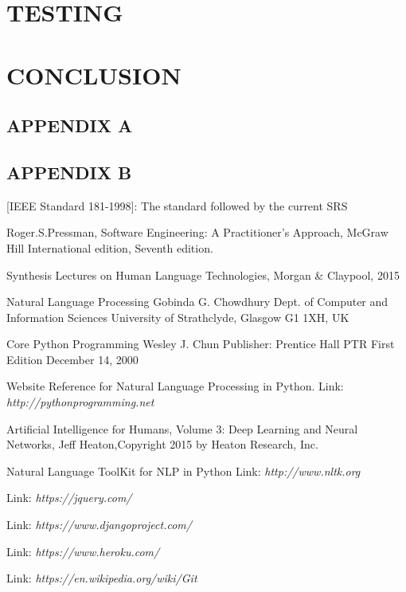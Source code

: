 \documentclass[a4 paper,11pt]{report}
\begin{document}
\chapter{TESTING}


\chapter{CONCLUSION}


\newpage
\renewcommand{\thepage}{\roman{page}}
\setcounter{page}{4}
\section*{APPENDIX A}




\newpage
\section*{APPENDIX B}


\renewcommand\bibname{References}
\begin{thebibliography}{9}
[IEEE Standard 181-1998]: The standard followed by the current SRS
 
Roger.S.Pressman, Software Engineering: A Practitioner’s Approach, McGraw Hill International edition, Seventh edition.
 
Synthesis Lectures on Human Language Technologies, Morgan \& Claypool, 2015

Natural Language Processing Gobinda G. Chowdhury Dept. of Computer and Information Sciences University of Strathclyde, Glasgow G1 1XH, UK

Core Python Programming Wesley J. Chun Publisher: Prentice Hall PTR First Edition December 14, 2000

Website Reference for Natural Language Processing in Python.
Link: \textit{http://pythonprogramming.net}

Artificial Intelligence for Humans, Volume 3: Deep Learning and Neural Networks, Jeff Heaton,Copyright    2015 by Heaton Research, Inc.

Natural Language ToolKit for NLP in Python
Link: \textit{http://www.nltk.org}

Link: \textit{https://jquery.com/}

Link: \textit{https://www.djangoproject.com/}

Link: \textit{https://www.heroku.com/}

Link: \textit{https://en.wikipedia.org/wiki/Git}
\end{thebibliography}
\end{document}
